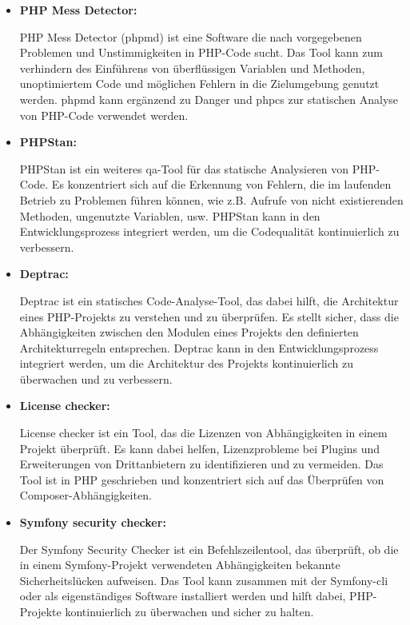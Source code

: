\begin{itemize}
    \item {
        \textbf{PHP Mess Detector:}\par
        PHP Mess Detector (\acrshort{phpmd}) ist eine Software die nach vorgegebenen Problemen und Unstimmigkeiten in
        PHP-Code sucht.
        Das Tool kann zum verhindern des Einführens von überflüssigen Variablen und Methoden, unoptimiertem Code und
        möglichen Fehlern in die Zielumgebung genutzt werden.
        \acrshort{phpmd} kann ergänzend zu Danger und \acrshort{phpcs} zur statischen Analyse von PHP-Code verwendet
        werden.
    }

    \item {
        \textbf{PHPStan:}\par
        PHPStan ist ein weiteres \acrshort{qa}-Tool für das statische Analysieren von PHP-Code.
        Es konzentriert sich auf die Erkennung von Fehlern, die im laufenden Betrieb zu Problemen führen können, wie
        z.B. Aufrufe von nicht existierenden Methoden, ungenutzte Variablen, usw.
        PHPStan kann in den Entwicklungsprozess integriert werden, um die Codequalität kontinuierlich zu verbessern.
    }

    \item {
        \textbf{Deptrac:}\par
        Deptrac ist ein statisches Code-Analyse-Tool, das dabei hilft, die Architektur eines PHP-Projekts zu verstehen
        und zu überprüfen.
        Es stellt sicher, dass die Abhängigkeiten zwischen den Modulen eines Projekts den definierten Architekturregeln
        entsprechen.
        Deptrac kann in den Entwicklungsprozess integriert werden, um die Architektur des Projekts kontinuierlich zu
        überwachen und zu verbessern.
    }

    \item {
        \textbf{License checker:}\par
        License checker ist ein Tool, das die Lizenzen von Abhängigkeiten in einem Projekt überprüft.
        Es kann dabei helfen, Lizenzprobleme bei Plugins und Erweiterungen von Drittanbietern zu identifizieren und zu
        vermeiden.
        Das Tool ist in PHP geschrieben und konzentriert sich auf das Überprüfen von Composer-Abhängigkeiten.
    }

    \item {
        \textbf{Symfony security checker:}\par
        Der Symfony Security Checker ist ein Befehlszeilentool, das überprüft, ob die in einem Symfony-Projekt
        verwendeten Abhängigkeiten bekannte Sicherheitslücken aufweisen.
        Das Tool kann zusammen mit der Symfony-\acrshort{cli} oder als eigenständiges Software installiert werden und
        hilft dabei, PHP-Projekte kontinuierlich zu überwachen und sicher zu halten.
    }
\end{itemize}

